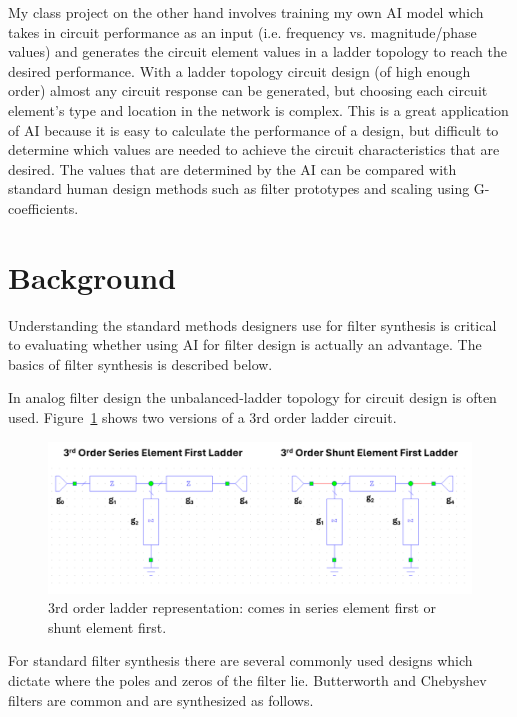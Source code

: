 \documentclass[10pt,conference]{IEEEtran}
\begin{document}
My class project on the other hand involves training my own AI model which takes in circuit performance as an input (i.e. frequency vs. magnitude/phase values) and generates the circuit element values in a ladder topology to reach the desired performance. With a ladder topology circuit design (of high enough order) almost any circuit response can be generated, but choosing each circuit element's type and location in the network is complex. This is a great application of AI because it is easy to calculate the performance of a design, but difficult to determine which values are needed to achieve the circuit characteristics that are desired. The values that are determined by the AI can be compared with standard human design methods such as filter prototypes and scaling using G-coefficients.



\section{Background}

Understanding the standard methods designers use for filter synthesis is critical to evaluating whether using AI for filter design is actually an advantage. The basics of filter synthesis is described below.

In analog filter design the unbalanced-ladder topology for circuit design is often used. Figure~\ref{Ladder_Topology_3rd_order} shows two versions of a 3rd order ladder circuit.

\begin{figure}
	\centering
	\includegraphics[width=0.9\linewidth]{Figures/Ladder_Topology_3rd_order.png}
	\caption{3rd order ladder representation: comes in series element first or shunt element first.}
	\label{Ladder_Topology_3rd_order}
\end{figure}



For standard filter synthesis there are several commonly used designs which dictate where the poles and zeros of the filter lie. Butterworth and Chebyshev filters are common and are synthesized as follows.
\end{document}
